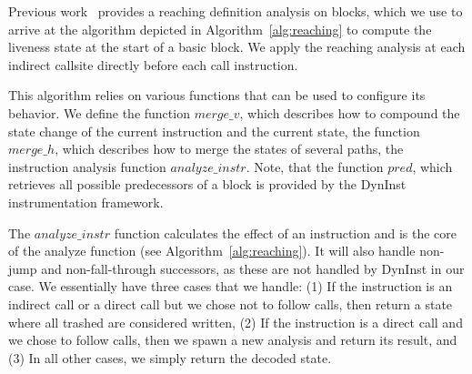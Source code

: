 %
%

Previous work~\cite{khedker2009data} provides a reaching definition analysis on blocks, which we use to arrive at the algorithm depicted in 
Algorithm~\ref{alg:reaching} to compute the liveness state at the start of a basic block. We apply the reaching analysis at each indirect 
callsite directly before each call instruction.

This algorithm relies on various functions that can be used to configure its behavior. We define the 
function $merge\_v$, which describes how to compound the state change of the current instruction and the current state, 
the function $merge\_h$, which describes how to merge the states of several paths, the instruction analysis function
$analyze\_instr$. Note, that the function $pred$, which retrieves all possible predecessors of a block 
is provided by the DynInst instrumentation framework.


The $analyze\_instr$ function calculates the effect of an instruction and is the core of the analyze function (see Algorithm~\ref{alg:reaching}). It will also 
handle non-jump and non-fall-through successors, as these are not handled by DynInst in our case. We essentially have three cases that we handle:
(1) If the instruction is an indirect call or a direct call but we chose not to follow calls, then return a state where all trashed are considered written,
(2) If the instruction is a direct call and we chose to follow calls, then we spawn a new analysis and return its result, and
(3) In all other cases, we simply return the decoded state.

